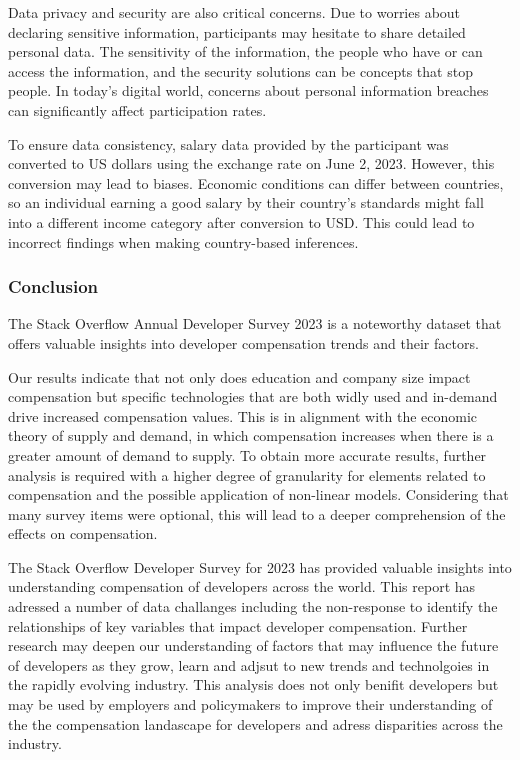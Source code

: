\documentclass[
  12pt,
]{article}
\begin{document}
Data privacy and security are also critical concerns. Due to worries
about declaring sensitive information, participants may hesitate to
share detailed personal data. The sensitivity of the information, the
people who have or can access the information, and the security
solutions can be concepts that stop people. In today's digital world,
concerns about personal information breaches can significantly affect
participation rates.

To ensure data consistency, salary data provided by the participant was
converted to US dollars using the exchange rate on June 2, 2023.
However, this conversion may lead to biases. Economic conditions can
differ between countries, so an individual earning a good salary by
their country's standards might fall into a different income category
after conversion to USD. This could lead to incorrect findings when
making country-based inferences.

\hypertarget{conclusion}{%
\subsubsection{Conclusion}\label{conclusion}}

The Stack Overflow Annual Developer Survey 2023 is a noteworthy dataset
that offers valuable insights into developer compensation trends and
their factors.

Our results indicate that not only does education and company size
impact compensation but specific technologies that are both widly used
and in-demand drive increased compensation values. This is in alignment
with the economic theory of supply and demand, in which compensation
increases when there is a greater amount of demand to supply. To obtain
more accurate results, further analysis is required with a higher degree
of granularity for elements related to compensation and the possible
application of non-linear models. Considering that many survey items
were optional, this will lead to a deeper comprehension of the effects
on compensation.

The Stack Overflow Developer Survey for 2023 has provided valuable
insights into understanding compensation of developers across the world.
This report has adressed a number of data challanges including the
non-response to identify the relationships of key variables that impact
developer compensation. Further research may deepen our understanding of
factors that may influence the future of developers as they grow, learn
and adjsut to new trends and technolgoies in the rapidly evolving
industry. This analysis does not only benifit developers but may be used
by employers and policymakers to improve their understanding of the the
compensation landascape for developers and adress disparities across the
industry.
\end{document}
